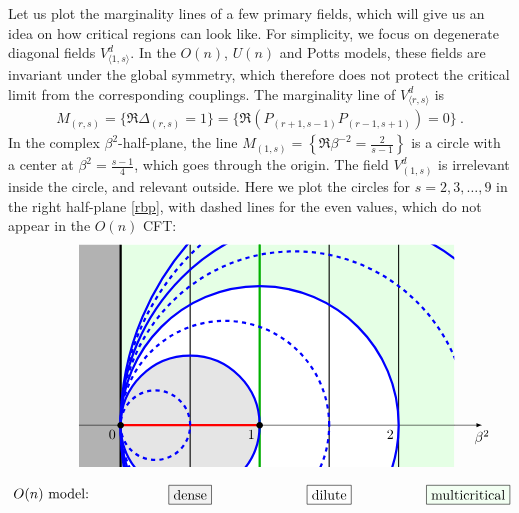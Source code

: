 \documentclass[12pt, a4paper]{article}
\theoremstyle{break}
\begin{document}
Let us plot the marginality lines of a few primary fields, which will give us an idea on how critical regions can look like. For simplicity, we focus on degenerate diagonal fields $V^d_{\langle 1,s\rangle}$. In the $O(n)$, $U(n)$ and Potts models, these fields are invariant under the global symmetry, which therefore does not protect the critical limit from the corresponding couplings. The marginality line of $V^d_{\langle r,s\rangle}$ is
\begin{align}
 M_{(r,s)} = \Big\{\Re\Delta_{(r,s)} = 1 \Big\} = \Big\{\Re \left(P_{(r+1,s-1)}P_{(r-1,s+1)}\right) = 0\Big\} \ . 
\end{align}
In the complex $\beta^2$-half-plane, the line $M_{(1,s)}=\left\{\Re\beta^{-2}=\frac{2}{s-1}\right\}$ is a circle with a center at $\beta^2=\frac{s-1}{4}$, which goes through the origin. The field $V^d_{(1,s)}$ is irrelevant inside the circle, and relevant outside. Here we plot the circles for $s=2,3,\dots, 9$ in the right half-plane \eqref{rbp}, with dashed lines for the even values, which do not appear in the $O(n)$ CFT:
\begin{align}
 \begin{tikzpicture}[baseline=(current  bounding  box.center), scale = 3.5]
 \draw [-latex] (-.3, 0) -- (2.6, 0) node[below]{$\beta^2$};
 \node at (-.5, -.5) {$O(n)$ model:};
 \node[draw, fill = black!5] at (.5, -.5) {dense};
 \node[draw] at (1.5, -.5) {dilute};
 \node[draw, fill = green!5] at (2.5, -.5) {multicritical};
 \clip (-.3, -.3) -- (-.3, 1.3) -- (2.4, 1.3) -- (2.4, -.3) -- cycle;
 \fill [color = green!10] (0, -1.3) -- (2.4, -1.3) -- (2.4, 1.3) -- (0, 1.3) -- cycle;
  \fill [color = white] (1, 0) circle [radius = 1];
 \fill [color = black!10] (.5, 0) circle [radius = .5];
 \fill [color = black!30] (0, -1.3) -- (-.3, -1.3) -- (-.3, 1.3) -- (0, 1.3) -- cycle;
 \draw[ultra thick] (0, -1.3) -- (0, 1.3);
 \draw[thick] (.5, -1.3) -- (.5, 1.3);
 \draw[thick] (1, -1.3) -- (1, 1.3);
 \draw[thick] (1.5, -1.3) -- (1.5, 1.3);
 \draw[thick] (2, -1.3) -- (2, 1.3);
 \draw[ultra thick, green!70!black] (1, -1) -- (1,1.5);
  \draw [-latex] (-.3, 0) -- (0, 0) node [below left] {$0$} -- (1, 0) node [below left] {$1$} -- (2, 0) node[below left] {$2$} -- (2.6, 0);
   \draw [ultra thick, red] (0, 0) -- (1, 0); 
  \foreach \s in {2,4,6,8}{
  \draw [ultra thick, dashed, blue] ({(\s-1)/4}, 0) circle [radius = (\s-1)/4];
  \draw [ultra thick, blue] ({\s/4}, 0) circle [radius = \s/4];
  }
 \node at (1, 0) [fill, circle, scale = .5] {};
 \node at (0, 0) [fill, circle, scale = .5] {};
 \end{tikzpicture} 
 \label{phases}
\end{align}
\end{document}
